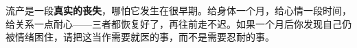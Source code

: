 \begin{tcolorbox}[colback=pink!5!white,colframe=red!50!black,title=贴心小叮咛]
流产是一段\textbf{真实的丧失}，哪怕它发生在很早期。给身体一个月，给心情一段时间，给关系一点耐心——三者都恢复好了，再往前走不迟。如果一个月后你发现自己仍被情绪困住，请把这当作需要就医的事，而不是需要忍耐的事。
\end{tcolorbox}

